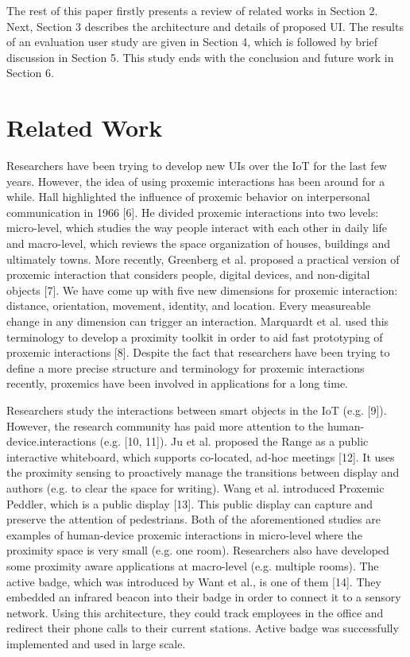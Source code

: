 \documentclass[runningheads,a4paper]{llncs}
\begin{document}
The rest of this paper firstly presents a review of related works in Section
2. Next, Section 3 describes the architecture and details of proposed UI. The
results of an evaluation user study are given in Section 4, which is followed by
brief discussion in Section 5. This study ends with the conclusion and future
work in Section 6.


\section{Related Work}
Researchers have been trying to develop new UIs over the IoT for the last few
years. However, the idea of using proxemic interactions has been around for
a while. Hall highlighted the influence of proxemic behavior on interpersonal
communication in 1966 [6]. He divided proxemic interactions into two levels:
micro-level, which studies the way people interact with each other in daily life
and macro-level, which reviews the space organization of houses, buildings and
ultimately towns. More recently, Greenberg et al. proposed a practical version
of proxemic interaction that considers people, digital devices, and non-digital
objects [7]. We have come up with five new dimensions for proxemic interaction: distance, orientation, movement, identity, and location. Every measureable change in any dimension can trigger an interaction. Marquardt et al. used this terminology to
develop a proximity toolkit in order to aid fast prototyping of proxemic interactions [8]. Despite the fact that researchers have been trying to define a more
precise structure and terminology for proxemic interactions recently, proxemics
have been involved in applications for a long time.



Researchers study the interactions between smart objects in the IoT (e.g. [9]). However, the research community has paid more attention to the human-device.interactions (e.g. [10, 11]). Ju et al. proposed the Range as a public interactive
whiteboard, which supports co-located, ad-hoc meetings [12]. It uses the proximity sensing to proactively manage the transitions between display and authors
(e.g. to clear the space for writing). Wang et al. introduced Proxemic Peddler,
which is a public display [13]. This public display can capture and preserve the
attention of pedestrians. Both of the aforementioned studies are examples of
human-device proxemic interactions in micro-level where the proximity space
is very small (e.g. one room). Researchers also have developed some proximity
aware applications at macro-level (e.g. multiple rooms). The active badge, which
was introduced by Want et al., is one of them [14]. They embedded an infrared
beacon into their badge in order to connect it to a sensory network. Using this
architecture, they could track employees in the office and redirect their phone
calls to their current stations. Active badge was successfully implemented and
used in large scale.
\end{document}
